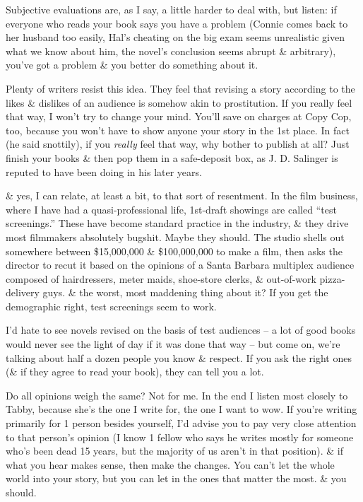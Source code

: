 \documentclass{article}
\numberwithin{equation}{section}
\begin{document}
Subjective evaluations are, as I say, a little harder to deal with, but listen: if everyone who reads your book says you have a problem (Connie comes back to her husband too easily, Hal's cheating on the big exam seems unrealistic given what we know about him, the novel's conclusion seems abrupt \& arbitrary), you've got a problem \& you better do something about it.

Plenty of writers resist this idea. They feel that revising a story according to the likes \& dislikes of an audience is somehow akin to prostitution. If you really feel that way, I won't try to change your mind. You'll save on charges at Copy Cop, too, because you won't have to show anyone your story in the 1st place. In fact (he said snottily), if you \textit{really} feel that way, why bother to publish at all? Just finish your books \& then pop them in a safe-deposit box, as J. D. Salinger is reputed to have been doing in his later years.

\& yes, I can relate, at least a bit, to that sort of resentment. In the film business, where I have had a quasi-professional life, 1st-draft showings are called ``test screenings.'' These have become standard practice in the industry, \& they drive most filmmakers absolutely bugshit. Maybe they should. The studio shells out somewhere between \$15,000,000 \& \$100,000,000 to make a film, then asks the director to recut it based on the opinions of a Santa Barbara multiplex audience composed of hairdressers, meter maids, shoe-store clerks, \& out-of-work pizza-delivery guys. \& the worst, most maddening thing about it? If you get the demographic right, test screenings seem to work.

I'd hate to see novels revised on the basis of test audiences -- a lot of good books would never see the light of day if it was done that way -- but come on, we're talking about half a dozen people you know \& respect. If you ask the right ones (\& if they agree to read your book), they can tell you a lot.

Do all opinions weigh the same? Not for me. In the end I listen most closely to Tabby, because she's the one I write for, the one I want to wow. If you're writing primarily for 1 person besides yourself, I'd advise you to pay very close attention to that person's opinion (I know 1 fellow who says he writes mostly for someone who's been dead 15 years, but the majority of us aren't in that position). \& if what you hear makes sense, then make the changes. You can't let the whole world into your story, but you can let in the ones that matter the most. \& you should.
\end{document}
